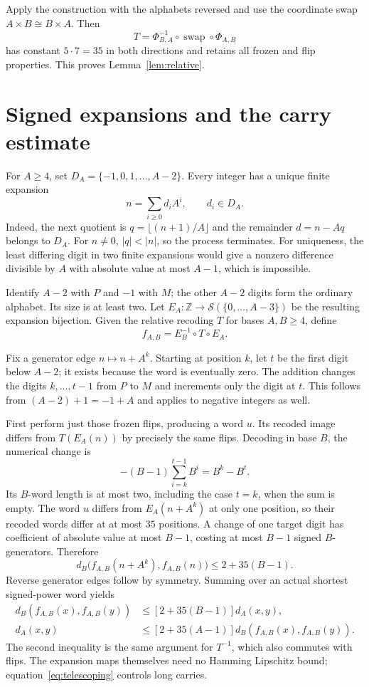 \documentclass[11pt]{article}
\newcommand{\Z}{\mathbb Z}
\begin{document}
Apply the construction with the alphabets reversed and use the coordinate
swap $A\times B\cong B\times A$. Then
\[
 T=\Phi_{B,A}^{-1}\circ\operatorname{swap}\circ\Phi_{A,B}
\]
has constant $5\cdot7=35$ in both directions and retains all frozen and
flip properties. This proves Lemma~\ref{lem:relative}.

\section{Signed expansions and the carry estimate}
For $A\ge4$, set $D_A=\{-1,0,1,\ldots,A-2\}$.
Every integer has a unique finite expansion
\begin{equation}\label{eq:digits}
 n=\sum_{i\ge0}d_i A^i,\qquad d_i\in D_A.
\end{equation}
Indeed, the next quotient is $q=\lfloor(n+1)/A\rfloor$ and the remainder
$d=n-Aq$ belongs to $D_A$. For $n\ne0$, $|q|<|n|$, so the process
terminates. For uniqueness, the least differing digit in two finite
expansions would give a nonzero difference divisible by $A$ with absolute
value at most $A-1$, which is impossible.

Identify $A-2$ with $P$ and $-1$ with $M$; the other $A-2$ digits form
the ordinary alphabet. Its size is at least two. Let
$E_A:\Z\to\mathcal S(\{0,\ldots,A-3\})$ be the resulting expansion
bijection. Given the relative recoding $T$ for bases $A,B\ge4$, define
\[
 f_{A,B}=E_B^{-1}\circ T\circ E_A.
\]

Fix a generator edge $n\mapsto n+A^k$. Starting at position $k$, let $t$
be the first digit below $A-2$; it exists because the word is eventually
zero. The addition changes the digits $k,\ldots,t-1$ from $P$ to $M$
and increments only the digit at $t$. This follows from
$(A-2)+1=-1+A$ and applies to negative integers as well.

First perform just those frozen flips, producing a word $u$. Its recoded
image differs from $T(E_A(n))$ by precisely the same flips. Decoding in
base $B$, the numerical change is
\begin{equation}\label{eq:telescoping}
 -(B-1)\sum_{i=k}^{t-1}B^i=B^k-B^t.
\end{equation}
Its $B$-word length is at most two, including the case $t=k$, when the
sum is empty. The word $u$ differs from $E_A(n+A^k)$ at only one position,
so their recoded words differ at at most $35$ positions. A change of one
target digit has coefficient of absolute value at most $B-1$, costing at
most $B-1$ signed $B$-generators. Therefore
\[
 d_B\bigl(f_{A,B}(n+A^k),f_{A,B}(n)\bigr)\le2+35(B-1).
\]
Reverse generator edges follow by symmetry. Summing over an actual
shortest signed-power word yields
\begin{align*}
 d_B(f_{A,B}(x),f_{A,B}(y))&\le[2+35(B-1)]d_A(x,y),\\
 d_A(x,y)&\le[2+35(A-1)]d_B(f_{A,B}(x),f_{A,B}(y)).
\end{align*}
The second inequality is the same argument for $T^{-1}$, which also
commutes with flips. The expansion maps themselves need no Hamming
Lipschitz bound; equation~\eqref{eq:telescoping} controls long carries.
\end{document}
